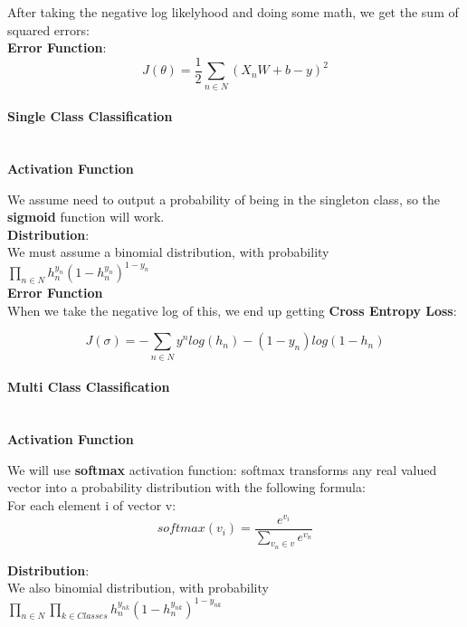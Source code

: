 \documentclass[a4paper]{article}
\begin{document}
    After taking the negative log likelyhood and doing some math, we get the sum of squared errors: \\
    
    \textbf{Error Function}: \\
    $$ J(\theta) = \frac{1}{2} \sum_{n \in N} (X_nW + b - y)^2$$
    
    
    \paragraph{Single Class Classification\\ \\ }
    
    \textbf{Activation Function}
    
    We assume need to output a probability of being in the singleton class, so the \textbf{sigmoid} function will work. \\
    
    \textbf{Distribution}: \\
    We must assume a binomial distribution, with probability $\prod_{n \in N} h_n^{y_n} (1 - h_n^{y_n})^{1-y_n}$ \\
    
    \textbf{Error Function} \\
    When we take the negative log of this, we end up getting \textbf{Cross Entropy Loss}: 
    
    $$J(\sigma) = -\sum_{n \in N} y^n log(h_n) - (1-y_n)log(1-h_n)$$
    
   
    \paragraph{Multi Class Classification\\ \\ }
    
    \textbf{Activation Function}
    
    We will use \textbf{softmax} activation function: softmax transforms any real valued vector into a probability 
    distribution with the following formula: \\
    
    For each element i of vector v: $$softmax(v_i) = \frac{e^{v_i}}{\sum_{v_n \in v}e^{v_n}}$$
    
    \textbf{Distribution}: \\
    We also binomial distribution, with probability $\prod_{n \in N} \prod_{k \in Classes}  h_n^{y_{nk}} (1 - h_n^{y_{nk}})^{1-y_{nk}}$ \\
    
\end{document}
